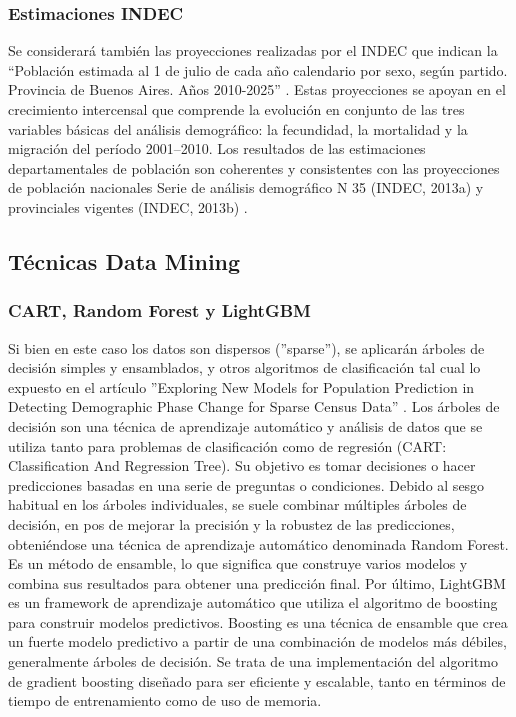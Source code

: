 \documentclass{article}
\theoremstyle{mytheoremstyle}
\theoremstyle{mytheoremstyle}
\theoremstyle{myproblemstyle}
\begin{document}
\subsubsection{Estimaciones INDEC}
 Se considerará también las proyecciones realizadas por el INDEC que indican la “Población estimada al 1 de julio de
 cada año calendario por sexo, según partido. Provincia de Buenos Aires. Años 2010-2025” .\newline\newline
  Estas proyecciones se apoyan en el crecimiento intercensal que comprende la evolución en conjunto
 de las tres variables básicas del análisis demográfico: la fecundidad, la mortalidad y la migración del período
 2001--2010. Los resultados de las estimaciones departamentales de población son coherentes y consistentes
 con las proyecciones de población nacionales Serie de análisis demográfico N 35 (INDEC, 2013a) y
 provinciales vigentes (INDEC, 2013b) .

\subsection{Técnicas Data Mining}

\subsubsection{CART, Random Forest  y LightGBM}
 Si bien en este caso los datos son dispersos (''sparse''), se aplicarán árboles de decisión simples y ensamblados, y otros algoritmos de clasificación
 tal cual lo expuesto en el artículo ''Exploring New Models for Population Prediction in Detecting Demographic
  Phase Change for Sparse Census Data'' . \newline\newline
  Los árboles de decisión son una técnica de aprendizaje automático y análisis de datos que se utiliza tanto
   para problemas de clasificación como de regresión (CART: Classification And Regression Tree).  Su objetivo es tomar decisiones o
  hacer predicciones basadas en una serie de preguntas o condiciones.  Debido al sesgo habitual en los árboles 
  individuales, se suele combinar múltiples árboles de  decisión, en pos de mejorar la precisión y la robustez de las predicciones, 
obteniéndose una técnica de aprendizaje automático denominada Random Forest. Es un método de ensamble, lo 
  que significa que construye varios modelos y combina sus resultados para obtener una predicción final.\newline\newline
  Por último, LightGBM es un framework de aprendizaje automático que utiliza el algoritmo de 
  boosting para construir modelos predictivos. Boosting es una técnica de ensamble que crea un fuerte modelo 
  predictivo a partir de una combinación de modelos más débiles, generalmente árboles de decisión. Se trata de una implementación del 
algoritmo de gradient boosting diseñado para ser eficiente y escalable, tanto en términos de tiempo de entrenamiento como de uso de memoria.
 
\end{document}
